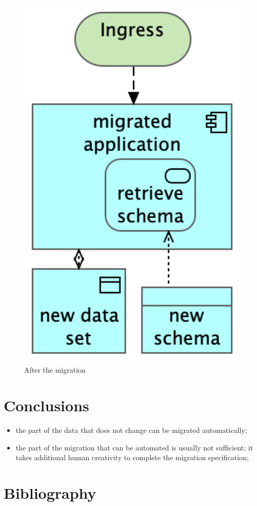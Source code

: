 \documentclass{elsarticle}
\begin{document}
\begin{figure}
   \centering
   \includegraphics[scale=0.1]{figures/After migration.png}
   \caption{After the migration}
   \label{fig:after}
\end{figure}

\section{Conclusions}
\begin{itemize}
   \item the part of the data that does not change can be migrated automatically;
   \item the part of the migration that can be automated is usually not sufficient;
         it takes additional human creativity to complete the migration specification;
\end{itemize}
\section{Bibliography}


\end{document}
